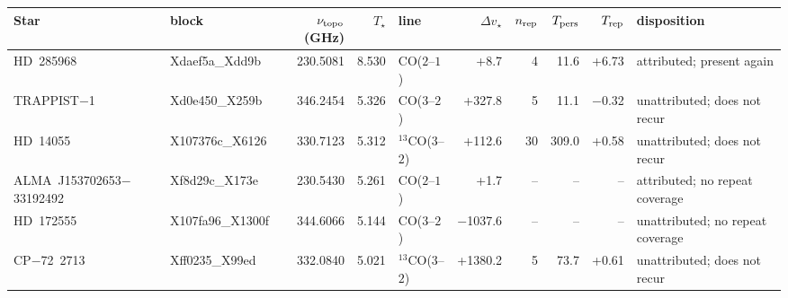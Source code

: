 \begin{tabular}{@{}l@{~}l@{~}r@{~}r@{~}l@{~}r@{~~}r@{~}r@{~}r@{~}l@{}}
\hline
Star & block & $\nu_{\rm topo}$ (GHz) & $T_\star$ & line & $\Delta v_\star$ & $n_{\rm rep}$ & $T_{\rm pers}$ & $T_{\rm rep}$ & disposition \\
\hline
HD~285968 & Xdaef5a\_Xdd9b & 230.5081 & 8.530 & CO($2$--$1$) & +8.7 & 4 & 11.6 & +6.73 & attributed; present again \\
TRAPPIST$-$1 & Xd0e450\_X259b & 346.2454 & 5.326 & CO($3$--$2$) & +327.8 & 5 & 11.1 & \ensuremath{-}0.32 & unattributed; does not recur \\
HD~14055 & X107376c\_X6126 & 330.7123 & 5.312 & $^{13}$CO($3$--$2$) & +112.6 & 30 & 309.0 & +0.58 & unattributed; does not recur \\
ALMA~J153702653$-$33192492 & Xf8d29c\_X173e & 230.5430 & 5.261 & CO($2$--$1$) & +1.7 & -- & -- & -- & attributed; no repeat coverage \\
HD~172555 & X107fa96\_X1300f & 344.6066 & 5.144 & CO($3$--$2$) & \ensuremath{-}1037.6 & -- & -- & -- & unattributed; no repeat coverage \\
CP$-$72~2713 & Xff0235\_X99ed & 332.0840 & 5.021 & $^{13}$CO($3$--$2$) & +1380.2 & 5 & 73.7 & +0.61 & unattributed; does not recur \\
\hline
\end{tabular}
